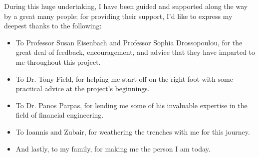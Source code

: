 \begin{acknowledgements}
    During this huge undertaking, I have been guided and supported along the way by a great many people; for providing their support, I'd like to express my deepest thanks to the following:
    \begin{itemize}
        \item To Professor Susan Eisenbach and Professor Sophia Drossopoulou, for the great deal of feedback, encouragement, and advice that they have imparted to me throughout this project.
        \item To Dr. Tony Field, for helping me start off on the right foot with some practical advice at the project's beginnings.
        \item To Dr. Panos Parpas, for lending me some of his invaluable expertise in the field of financial engineering.
        \item To Ioannis and Zubair, for weathering the trenches with me for this journey.
        \item And lastly, to my family, for making me the person I am today.
    \end{itemize}
\end{acknowledgements}